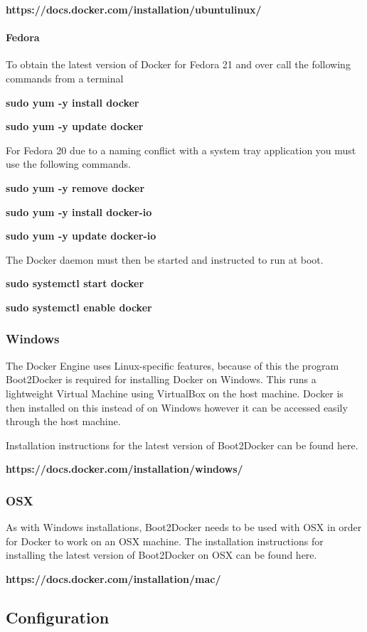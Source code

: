 \documentclass[10pt,a4paper]{article}
\begin{document}
\centerline{\textbf{https://docs.docker.com/installation/ubuntulinux/}}

\paragraph{Fedora}
To obtain the latest version of Docker for Fedora 21 and over call the following commands from a terminal

\centerline{\textbf{sudo yum -y install docker}}
\centerline{\textbf{sudo yum -y update docker}}

For Fedora 20 due to a naming conflict with a system tray application you must use the following commands.

\centerline{\textbf{sudo yum -y remove docker}}
\centerline{\textbf{sudo yum -y install docker-io}}
\centerline{\textbf{sudo yum -y update docker-io}}

The Docker daemon must then be started and instructed to run at boot.

\centerline{\textbf{sudo systemctl start docker}}
\centerline{\textbf{sudo systemctl enable docker}}

\subsubsection{Windows}

The Docker Engine uses Linux-specific features, because of this the program Boot2Docker is required for installing Docker on Windows. This runs a lightweight Virtual Machine using VirtualBox on the host machine. Docker is then installed on this instead of on Windows however it can be accessed easily through the host machine.

Installation instructions for the latest version of Boot2Docker can be found here.
\centerline{\textbf{https://docs.docker.com/installation/windows/}}

\subsubsection{OSX}
As with Windows installations, Boot2Docker needs to be used with OSX in order for Docker to work on an OSX machine.
The installation instructions for installing the latest version of Boot2Docker on OSX can be found here.
\centerline{\textbf{https://docs.docker.com/installation/mac/}}

\newpage
 
\subsection{Configuration}
\end{document}
